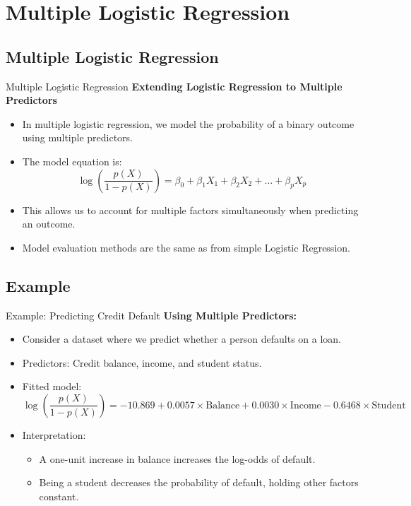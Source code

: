 \documentclass[aspectratio=169,xcolor=dvipsnames]{beamer}
\begin{document}
\section{Multiple Logistic Regression}
\subsection{Multiple Logistic Regression}
\begin{frame}{Multiple Logistic Regression}
    \textbf{Extending Logistic Regression to Multiple Predictors}
    \begin{itemize}
        \item In multiple logistic regression, we model the probability of a binary outcome using multiple predictors.
        \item The model equation is:
        \begin{equation}
            \log \left( \frac{p(X)}{1 - p(X)} \right) = \beta_0 + \beta_1 X_1 + \beta_2 X_2 + \dots + \beta_p X_p
        \end{equation}
        \item This allows us to account for multiple factors simultaneously when predicting an outcome.
        \item Model evaluation methods are the same as from simple Logistic Regression.
    \end{itemize}
\end{frame}

\subsection{Example}
\begin{frame}{Example: Predicting Credit Default}
    \textbf{Using Multiple Predictors:}
    \begin{itemize}
        \item Consider a dataset where we predict whether a person defaults on a loan.
        \item Predictors: Credit balance, income, and student status.
        \item Fitted model:
        \begin{equation}
            \log \left( \frac{p(X)}{1 - p(X)} \right) = -10.869 + 0.0057 \times \text{Balance} + 0.0030 \times \text{Income} - 0.6468 \times \text{Student}
        \end{equation}
        \item Interpretation:
        \begin{itemize}
            \item A one-unit increase in balance increases the log-odds of default.
            \item Being a student decreases the probability of default, holding other factors constant.
        \end{itemize}
    \end{itemize}
\end{frame}
\end{document}
